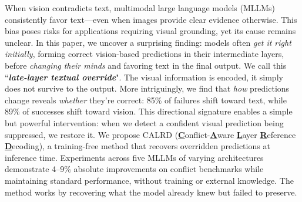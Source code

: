 When vision contradicts text, multimodal large language models (MLLMs) consistently favor text—even when images provide clear evidence otherwise. This bias poses risks for applications requiring visual grounding, yet its cause remains unclear. In this paper, we uncover a surprising finding: models often \emph{get it right initially}, forming correct vision-based predictions in their intermediate layers, before \emph{changing their minds} and favoring text in the final output. We call this ``\textbf{\textit{late-layer textual override}}". The visual information is encoded, it simply does not survive to the output. More intriguingly, we find that \emph{how} predictions change reveals \emph{whether} they're correct: 85\% of failures shift toward text, while 89\% of successes shift toward vision. This directional signature enables a simple but powerful intervention: when we detect a confident visual prediction being suppressed, we restore it. We propose CALRD (\textbf{\underline{C}}onflict-\textbf{\underline{A}}ware \textbf{\underline{L}}ayer \textbf{\underline{R}}eference \textbf{\underline{D}}ecoding), a training-free method that recovers overridden predictions at inference time. Experiments across five MLLMs of varying architectures demonstrate 4–9\% absolute improvements on conflict benchmarks while maintaining standard performance, without training or external knowledge. The method works by recovering what the model already knew but failed to preserve.
